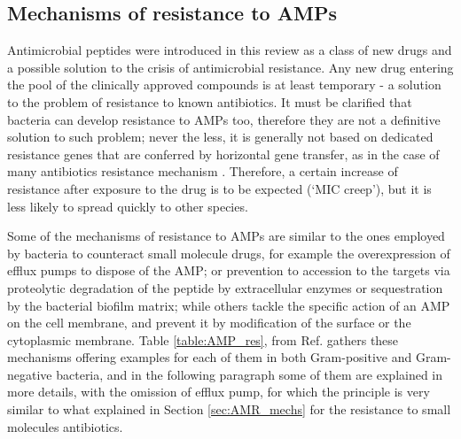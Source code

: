 \subsection{Mechanisms of resistance to AMPs}

Antimicrobial peptides were introduced in this review as a class of new drugs and a possible solution to the crisis of antimicrobial resistance. Any new drug entering the pool of the clinically approved compounds is at least temporary - a solution to the problem of resistance to known antibiotics. It must be clarified that bacteria can develop resistance to AMPs too, therefore they are not a definitive solution to such problem; never the less, it is generally not based on dedicated resistance genes that are conferred by horizontal gene transfer, as in the case of many antibiotics resistance mechanism \cite{Peschel2006,Juhas2015}.
Therefore, a certain increase of resistance after exposure to the drug is to be expected (‘MIC creep’), %
but it is less likely to spread quickly to other species.

Some of the mechanisms of resistance to AMPs are similar to the ones employed by bacteria to counteract small molecule drugs, for example the overexpression of efflux pumps to dispose of the AMP; or prevention to accession to the targets via proteolytic degradation of the peptide by extracellular enzymes or sequestration by the bacterial biofilm matrix; while others tackle the specific action of an AMP on the cell membrane, and prevent it by modification of the surface or the cytoplasmic membrane. Table \ref{table:AMP_res}, from Ref. \cite{Joo2016} gathers these mechanisms offering examples for each of them in both Gram-positive and Gram-negative bacteria, and in the following paragraph some of them are explained in more details, with the omission of efflux pump, for which the principle is very similar to what explained in Section \ref{sec:AMR_mechs} for the resistance to small molecules antibiotics.

